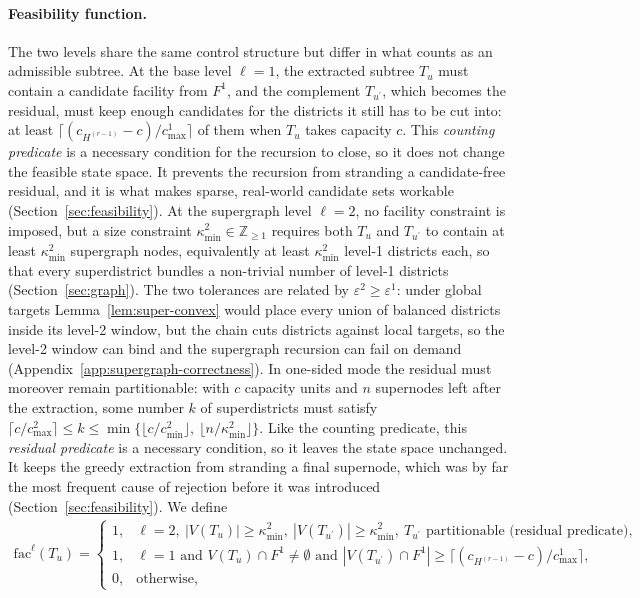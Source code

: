 \documentclass[preprint,12pt,authoryear]{elsarticle}
\theoremstyle{definition}
\begin{document}
\paragraph{Feasibility function.}
The two levels share the same control structure but differ in what counts as an admissible subtree. At the base level $\ell =1$, the extracted subtree $T_u$ must contain a candidate facility from $F^1$, and the complement $T_{u^\prime}$, which becomes the residual, must keep enough candidates for the districts it still has to be cut into: at least $\lceil (c_{H^{(r-1)}}-c)/c^{1}_{\max}\rceil$ of them when $T_u$ takes capacity $c$. This \emph{counting predicate} is a necessary condition for the recursion to close, so it does not change the feasible state space. It prevents the recursion from stranding a candidate-free residual, and it is what makes sparse, real-world candidate sets workable (Section~\ref{sec:feasibility}). At the supergraph level $\ell=2$, no facility constraint is imposed, but a size constraint $\kappa^2_{\min} \in \mathbb{Z}_{\geq 1}$ requires both $T_u$ and $T_{u^\prime}$ to contain at least $\kappa^2_{\min}$ supergraph nodes, equivalently at least $\kappa^2_{\min}$ level-1 districts each, so that every superdistrict bundles a non-trivial number of level-1 districts (Section~\ref{sec:graph}). The two tolerances are related by $\varepsilon^{2} \geq \varepsilon^{1}$: under global targets Lemma~\ref{lem:super-convex} would place every union of balanced districts inside its level-2 window, but the chain cuts districts against local targets, so the level-2 window can bind and the supergraph recursion can fail on demand (Appendix~\ref{app:supergraph-correctness}). In one-sided mode the residual must moreover remain partitionable: with $c$ capacity units and $n$ supernodes left after the extraction, some number $k$ of superdistricts must satisfy $\lceil c/c^{2}_{\max}\rceil \leq k \leq \min\{\lfloor c/c^{2}_{\min}\rfloor,\ \lfloor n/\kappa^{2}_{\min}\rfloor\}$. Like the counting predicate, this \emph{residual predicate} is a necessary condition, so it leaves the state space unchanged. It keeps the greedy extraction from stranding a final supernode, which was by far the most frequent cause of rejection before it was introduced (Section~\ref{sec:feasibility}). We define
%
\begin{align*}
    \text{fac}^\ell(T_u) =
    \begin{cases}
        1, & \ell = 2,\ |V(T_u)| \geq \kappa^2_{\min},\ |V(T_{u^\prime})| \geq \kappa^2_{\min},\ T_{u^\prime} \text{ partitionable (residual predicate)}, \\
                1, & \ell = 1 \text{ and } V(T_u) \cap F^{1} \neq \emptyset \text{ and } |V(T_{u^\prime}) \cap F^{1}| \geq \bigl\lceil (c_{H^{(r-1)}}-c)/c^{1}_{\max}\bigr\rceil, \\
        0, & \text{otherwise},
    \end{cases}
\end{align*}
\end{document}
